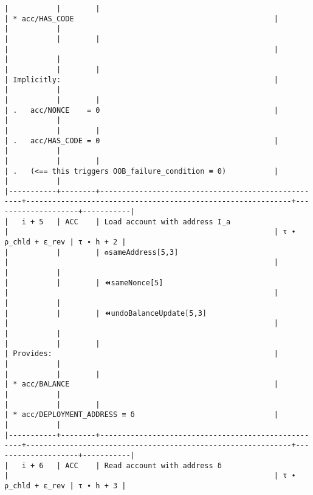 \documentclass[varwidth=\maxdimen,margin=0.5cm,multi={verbatim}]{standalone}
\begin{document}
\begin{verbatim}
|           |        |                                                    | * acc/HAS_CODE                                              |                    |           |
|           |        |                                                    |                                                             |                    |           |
|           |        |                                                    | Implicitly:                                                 |                    |           |
|           |        |                                                    | .   acc/NONCE    = 0                                        |                    |           |
|           |        |                                                    | .   acc/HAS_CODE = 0                                        |                    |           |
|           |        |                                                    | .   (<== this triggers OOB_failure_condition ≡ 0)           |                    |           |
|-----------+--------+----------------------------------------------------+-------------------------------------------------------------+--------------------+-----------|
|   i + 5   | ACC    | Load account with address I_a                      |                                                             | τ ∙ ρ_chld + ε_rev | τ ∙ h + 2 |
|           |        | ♻️sameAddress[5,3]                                 |                                                             |                    |           |
|           |        | ⏪sameNonce[5]                                     |                                                             |                    |           |
|           |        | ⏪undoBalanceUpdate[5,3]                           |                                                             |                    |           |
|           |        |                                                    | Provides:                                                   |                    |           |
|           |        |                                                    | * acc/BALANCE                                               |                    |           |
|           |        |                                                    | * acc/DEPLOYMENT_ADDRESS ≡ δ                                |                    |           |
|-----------+--------+----------------------------------------------------+-------------------------------------------------------------+--------------------+-----------|
|   i + 6   | ACC    | Read account with address δ                        |                                                             | τ ∙ ρ_chld + ε_rev | τ ∙ h + 3 |

\end{verbatim}
\end{document}
